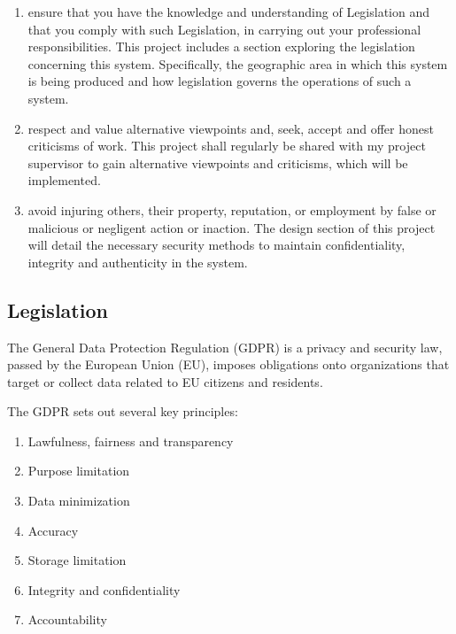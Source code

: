 \begin{enumerate}
\begin{enumerate}
     \item ensure that you have the knowledge and
     understanding of Legislation and that you comply
     with such Legislation, in carrying out your
     professional responsibilities.
     This project includes a section exploring the
     legislation concerning this system. Specifically, the
     geographic area in which this system is being
     produced and how legislation governs the operations
     of such a system.
     \item respect and value alternative viewpoints and,
     seek, accept and offer honest criticisms of work.
     This project shall regularly be shared with my project
     supervisor to gain alternative viewpoints and
     criticisms, which will be implemented.
     \item avoid injuring others, their property, reputation,
     or employment by false or malicious or negligent
     action or inaction.
     The design section of this project will detail the
     necessary security methods to maintain
     confidentiality, integrity and authenticity in the
     system. %
  \end{enumerate}
  \end{enumerate}
 
  \subsection{Legislation}
  The General Data Protection Regulation (GDPR) is a privacy
  and security law, passed by the European Union (EU),
  imposes obligations onto organizations that target or collect
  data related to EU citizens and residents. \cite{noauthor_general_nodate} \linebreak[1]
 
 The GDPR sets out several key principles:
 \begin{enumerate}
   \item Lawfulness, fairness and transparency
   \item Purpose limitation
   \item Data minimization
   \item Accuracy
   \item Storage limitation
   \item Integrity and confidentiality
   \item Accountability
 \end{enumerate}
 

